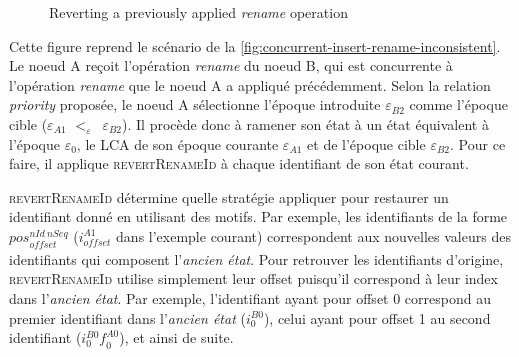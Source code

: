 \documentclass[12pt]{thesul}
\newcommand{\trm}[1]{\mathit{#1}}
\newcommand{\id}[3]{$\trm{#1}^{\trm{#2}}_{\trm{#3}}$}
\newcommand{\epoch}[1]{$\varepsilon_{#1}$}
\newcommand{\lepoch}{$<_{\varepsilon}$~}
\begin{document}
\begin{figure}[!ht]
{
  }
  \caption{Reverting a previously applied \emph{rename} operation}
  \label{fig:revertRenameId}
\end{figure}

Cette figure reprend le scénario de la \autoref{fig:concurrent-insert-rename-inconsistent}.
Le noeud A reçoit l'opération \emph{rename} du noeud B, qui est concurrente à l'opération \emph{rename} que le noeud A a appliqué précédemment.
Selon la relation \emph{priority} proposée, le noeud A sélectionne l'époque introduite \epoch{B2} comme l'époque cible (\epoch{A1} \lepoch \epoch{B2}).
Il procède donc à ramener son état à un état équivalent à l'époque \epoch{0}, le \ac{LCA} de son époque courante \epoch{A1} et de l'époque cible \epoch{B2}.
Pour ce faire, il applique \textsc{revertRenameId} à chaque identifiant de son état courant.

\textsc{revertRenameId} détermine quelle stratégie appliquer pour restaurer un identifiant donné en utilisant des motifs.
Par exemple, les identifiants de la forme \id{pos}{nId~nSeq}{offset} (\id{i}{A1}{offset} dans l'exemple courant) correspondent aux nouvelles valeurs des identifiants qui composent l'\emph{ancien état}.
Pour retrouver les identifiants d'origine, \textsc{revertRenameId} utilise simplement leur offset puisqu'il correspond à leur index dans l'\emph{ancien état}.
Par exemple, l'identifiant ayant pour offset 0 correspond au premier identifiant dans l'\emph{ancien état} (\id{i}{B0}{0}), celui ayant pour offset 1 au second identifiant (\id{i}{B0}{0}\id{f}{A0}{0}), et ainsi de suite.
\end{document}
